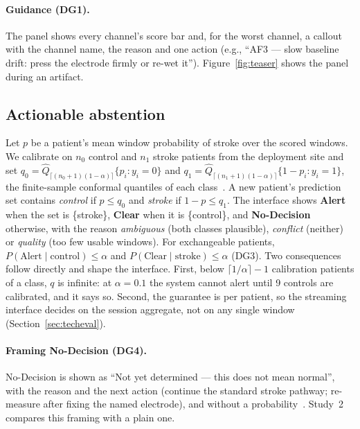 \documentclass[sigconf,review,anonymous]{acmart}
\begin{document}
\paragraph{Guidance (DG1).}
The panel shows every channel's score bar and, for the worst channel, a callout with the channel name, the reason and one action (e.g., ``AF3 --- slow baseline drift: press the electrode firmly or re-wet it''). Figure~\ref{fig:teaser} shows the panel during an artifact.

\subsection{Actionable abstention}
\label{sec:conformal}
Let $p$ be a patient's mean window probability of stroke over the scored windows.
We calibrate on $n_0$ control and $n_1$ stroke patients from the deployment site and set
$q_0 = \hat{Q}_{\lceil (n_0+1)(1-\alpha)\rceil}\{p_i : y_i{=}0\}$ and
$q_1 = \hat{Q}_{\lceil (n_1+1)(1-\alpha)\rceil}\{1-p_i : y_i{=}1\}$,
the finite-sample conformal quantiles of each class~\cite{angelopoulos2021gentle}.
A new patient's prediction set contains \emph{control} if $p \le q_0$ and \emph{stroke} if $1-p \le q_1$. The interface shows
\textbf{Alert} when the set is \{stroke\},
\textbf{Clear} when it is \{control\},
and \textbf{No-Decision} otherwise, with the reason \emph{ambiguous} (both classes plausible), \emph{conflict} (neither) or \emph{quality} (too few usable windows).
For exchangeable patients, $P(\text{Alert}\mid\text{control}) \le \alpha$ and $P(\text{Clear}\mid\text{stroke}) \le \alpha$ (DG3).
Two consequences follow directly and shape the interface.
First, below $\lceil 1/\alpha\rceil - 1$ calibration patients of a class, $q$ is infinite: at $\alpha{=}0.1$ the system cannot alert until 9 controls are calibrated, and it says so.
Second, the guarantee is per patient, so the streaming interface decides on the session aggregate, not on any single window (Section~\ref{sec:techeval}).

\paragraph{Framing No-Decision (DG4).}
No-Decision is shown as ``Not yet determined --- this does not mean normal'', with the reason and the next action (continue the standard stroke pathway; re-measure after fixing the named electrode), and without a probability~\cite{bondi2022}. Study~2 compares this framing with a plain one.

\end{document}
